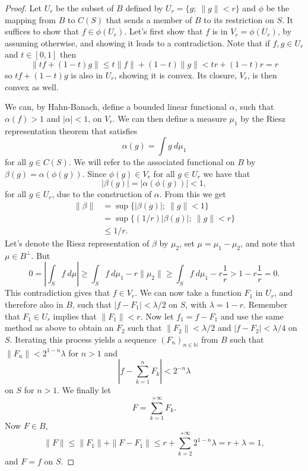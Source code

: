 \documentclass[a4paper,12pt,twoside,BCOR=10mm]{scrbook}
\theoremstyle{definition}
\theoremstyle{definition}
\theoremstyle{definition}
\begin{document}
\begin{proof}
Let $U_r$ be the subset of $B$ defined by $U_r = \{g;\ \|g\| < r\}$ and $\phi$ be the mapping from $B$ to $C(S)$ that sends a member of $B$ to its restriction on $S$.
It suffices to show that $f \in \phi(U_r)$.
Let's first show that $f$ is in $V_r = \overline{\phi(U_r)}$, by assuming otherwise, and showing it leads to a contradiction.
Note that if $f, g \in U_r$ and $t \in [0, 1]$ then
\[
	\|tf + (1 - t)g\| \leq t\|f\| + (1 - t)\|g\| < tr + (1 - t)r = r
\]
so $tf + (1 - t)g$ is also in $U_r$, showing it is convex.
Its closure, $V_r$, is then convex as well.

We can, by Hahn-Banach, define a bounded linear functional $\alpha$, such that $\alpha(f) > 1$ and $|\alpha| < 1$, on $V_r$.
We can then define a measure $\mu_1$ by the Riesz representation theorem that satisfies
\[
	\alpha(g) = \int g\ d\mu_1
\]
for all $g \in C(S)$.
We will refer to the associated functional on $B$ by $\beta(g) = \alpha(\phi(g))$.
Since $\phi(g) \in V_r$ for all $g \in U_r$ we have that
\[
	|\beta(g)| = |\alpha(\phi(g))| < 1,
\]
for all $g \in U_r$,
	due to the construction of $\alpha$.
From this we get
\begin{align*}
	\| \beta \|
	&= \sup \{ |\beta(g)|;\ \|g\| < 1 \}\\
	&= \sup \{ (1/r)|\beta(g)|;\ \|g\| < r \}\\
	&\leq 1/r.
\end{align*}
Let's
	denote the Riesz representation of $\beta$ by $\mu_2$,
	set $\mu = \mu_1 - \mu_2$,
	and note that $\mu \in B^{\bot}$.
But
\[
	0 = \left | \int_S f\ d\mu \right | 
		\geq \int_S f\ d\mu_1 - r\|\mu_2\| 
		\geq \int_S f\ d\mu_1 - r\frac{1}{r}
		> 1 - r \frac{1}{r} = 0.
\]
This contradiction gives that $f \in V_r$.
We can now take a function $F_1$ in $U_r$, and therefore also in $B$, such that $|f - F_1| < \lambda/2$ on $S$, with $\lambda = 1 - r$.
Remember that $F_1 \in U_r$ implies that $\|F_1\| < r$.
Now let $f_1 = f - F_1$ and use the same method as above to obtain an $F_2$ such that $\|F_2\| < \lambda/2$ and $|f - F_2| < \lambda/4$ on $S$.
Iterating this process yields a sequence $(F_n)_{n \in \mathbb{N}}$ from $B$ such that $\|F_n\| < 2^{1 - n}\lambda$ for $n > 1$ and
\[
	\left | f - \sum_{k = 1}^n F_k \right | < 2^{-n}\lambda
\]
on $S$ for $n > 1$.
We finally let 
\[
F = \sum_{k = 1}^{+\infty} F_k.
\]
Now $F \in B$,
\[
	\|F\| \leq \|F_1\| + \|F - F_1\| \leq r + \sum_{k = 2}^{+\infty}2^{1 - n}\lambda = r + \lambda = 1,
\]
and $F = f$ on $S$.
\end{proof}
\end{document}
